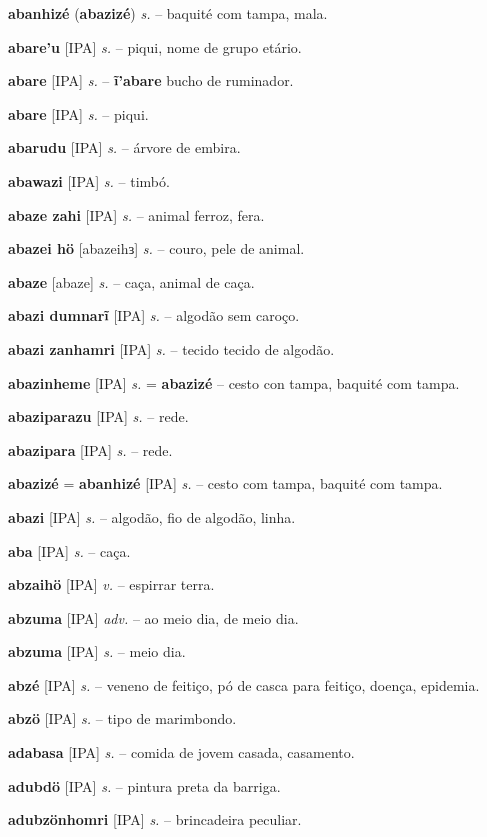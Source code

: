 \textbf{abanhizé} (\textbf{abazizé}) \textit{s.} --  baquité com tampa, mala.

\textbf{abare'u} [IPA] \textit{s.} -- piqui,  nome de grupo etário.

\textbf{abare} [IPA] \textit{s.} -- \textbf{ĩ'abare} bucho de ruminador.

\textbf{abare} [IPA] \textit{s.} -- piqui.

\textbf{abarudu} [IPA] \textit{s.} -- árvore de embira.

\textbf{abawazi} [IPA] \textit{s.} -- timbó.

\textbf{abaze zahi} [IPA] \textit{s.} -- animal ferroz, fera.

\textbf{abazei hö} [abazeihɜ] \textit{s.} -- couro, pele de animal.

\textbf{abaze} [abaze] \textit{s.} -- caça, animal de caça.

\textbf{abazi dumnarĩ} [IPA] \textit{s.} -- algodão sem caroço.

\textbf{abazi zanhamri} [IPA] \textit{s.} -- tecido tecido de algodão.

\textbf{abazinheme} [IPA] \textit{s.} = \textbf{abazizé} -- cesto con tampa, baquité com tampa.

\textbf{abaziparazu} [IPA] \textit{s.} -- rede.

\textbf{abazipara} [IPA] \textit{s.} -- rede.

\textbf{abazizé} = \textbf{abanhizé} [IPA] \textit{s.} -- cesto com tampa, baquité com tampa.

\textbf{abazi} [IPA] \textit{s.} -- algodão, fio de algodão, linha.

\textbf{aba} [IPA] \textit{s.} -- caça.

\textbf{abzaihö} [IPA] \textit{v.} -- espirrar terra.

\textbf{abzuma} [IPA] \textit{adv.} -- ao meio dia, de meio dia.

\textbf{abzuma} [IPA] \textit{s.} -- meio dia.

\textbf{abzé} [IPA] \textit{s.} -- veneno de feitiço, pó de casca para feitiço, doença, epidemia.

\textbf{abzö} [IPA] \textit{s.} -- tipo de marimbondo.

\textbf{adabasa} [IPA] \textit{s.} -- comida de jovem casada, casamento.

\textbf{adubdö} [IPA] \textit{s.} -- pintura preta da barriga.

\textbf{adubzönhomri} [IPA] \textit{s.} -- brincadeira peculiar.

